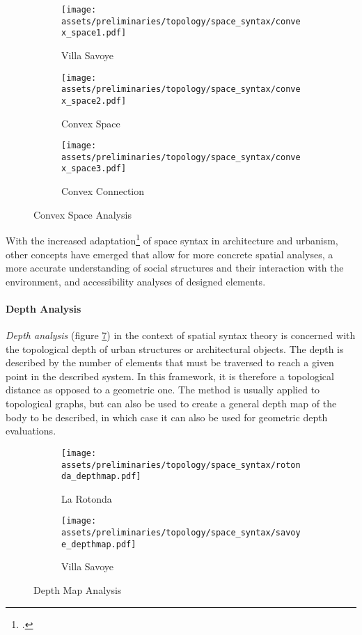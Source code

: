 \documentclass[a4paper, 12pt]{report}
\begin{document}
\begin{figure}
\centering
\begin{subfigure}{.24\textwidth}
\centering
\texttt{[image: assets/preliminaries/topology/space\_syntax/convex\_space1.pdf]}
\caption{Villa Savoye}
\label{fig:villa-savoye-4}
\end{subfigure}%
\begin{subfigure}{.38\textwidth}
\centering
\texttt{[image: assets/preliminaries/topology/space\_syntax/convex\_space2.pdf]}
\caption{Convex Space}
\label{fig:convex-space}
\end{subfigure}%
\begin{subfigure}{.38\textwidth}
\centering
\texttt{[image: assets/preliminaries/topology/space\_syntax/convex\_space3.pdf]}
\caption{Convex Connection}
\label{fig:convex-connection}
\end{subfigure}
\caption{Convex Space Analysis}
\label{fig:convex-space-analysis}
\end{figure}

With the increased adaptation\footcite{li2009design} of space syntax in architecture and urbanism, other concepts have emerged that allow for more concrete spatial analyses, a more accurate understanding of social structures and their interaction with the environment, and accessibility analyses of designed elements.

\paragraph{Depth Analysis}\label{par:depth-analysis}

\textit{Depth analysis} (figure \ref{fig:depth-map-analysis}) in the context of spatial syntax theory is concerned with the topological depth of urban structures or architectural objects. The depth is described by the number of elements that must be traversed to reach a given point in the described system. In this framework, it is therefore a topological distance as opposed to a geometric one. The method is usually applied to topological graphs, but can also be used to create a general depth map of the body to be described, in which case it can also be used for geometric depth evaluations.

\begin{figure}
\centering
\begin{subfigure}{.5\textwidth}
\centering
\texttt{[image: assets/preliminaries/topology/space\_syntax/rotonda\_depthmap.pdf]}
\caption{La Rotonda}
\label{fig:la-rotonda-5}
\end{subfigure}%
\begin{subfigure}{.5\textwidth}
\centering
\texttt{[image: assets/preliminaries/topology/space\_syntax/savoye\_depthmap.pdf]}
\caption{Villa Savoye}
\label{fig:villa-savoye-5}
\end{subfigure}
\caption{Depth Map Analysis}
\label{fig:depth-map-analysis}
\end{figure}
\end{document}
